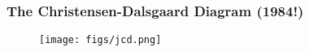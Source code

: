 \documentclass[10pt, compress]{beamer}
\begin{document}


\begin{frame}[fragile] \frametitle{The Christensen-Dalsgaard Diagram (1984!)}
    \begin{figure}[!hb] 
        \centering
        \texttt{[image: figs/jcd.png]}
    \end{figure}
\end{frame}
\end{document}

